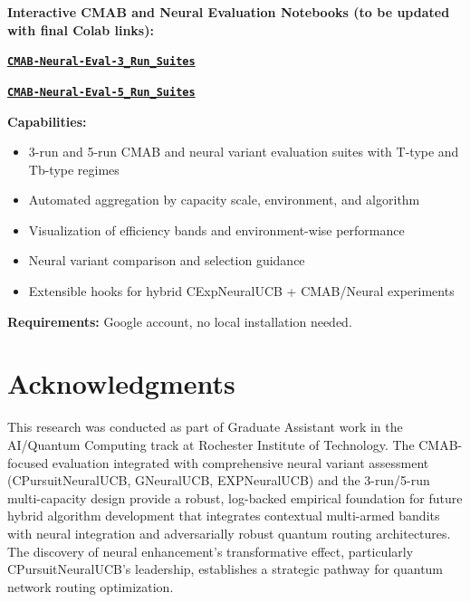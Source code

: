 \documentclass[12pt,a4paper]{article}
\newcommand{\colab}[1]{\textcolor{colabcolor}{\textbf{#1}}}
\begin{document}
\begin{tcolorbox}[colback=colabcolor!20,colframe=colabcolor,title=\textbf{Interactive Framework Access (Placeholder Links)}]

\begin{center}
\textbf{Interactive CMAB and Neural Evaluation Notebooks (to be updated with final Colab links):}
\vspace{0.3cm}

\href{https://colab.research.google.com/drive/PLACEHOLDER_3_RUNS}{\colab{\texttt{CMAB-Neural-Eval-3\_Run\_Suites}}}

\href{https://colab.research.google.com/drive/PLACEHOLDER_5_RUNS}{\colab{\texttt{CMAB-Neural-Eval-5\_Run\_Suites}}}

\vspace{0.3cm}
\textbf{Capabilities:}
\begin{itemize}
\item 3-run and 5-run CMAB and neural variant evaluation suites with T-type and Tb-type regimes
\item Automated aggregation by capacity scale, environment, and algorithm
\item Visualization of efficiency bands and environment-wise performance
\item Neural variant comparison and selection guidance
\item Extensible hooks for hybrid CExpNeuralUCB + CMAB/Neural experiments
\end{itemize}

\textbf{Requirements:} Google account, no local installation needed.
\end{center}
\end{tcolorbox}

\section{Acknowledgments}

This research was conducted as part of Graduate Assistant work in the AI/Quantum Computing track at Rochester Institute of Technology. The CMAB-focused evaluation integrated with comprehensive neural variant assessment (CPursuitNeuralUCB, GNeuralUCB, EXPNeuralUCB) and the 3-run/5-run multi-capacity design provide a robust, log-backed empirical foundation for future hybrid algorithm development that integrates contextual multi-armed bandits with neural integration and adversarially robust quantum routing architectures. The discovery of neural enhancement's transformative effect, particularly CPursuitNeuralUCB's leadership, establishes a strategic pathway for quantum network routing optimization.
\end{document}
